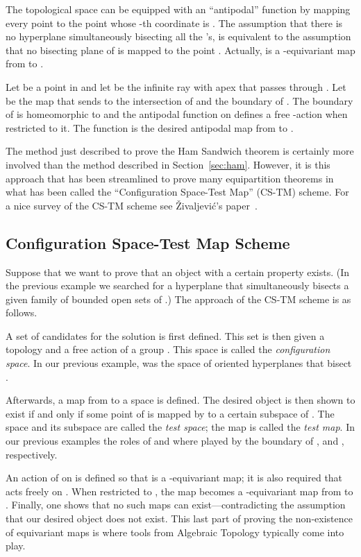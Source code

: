 \documentclass{article}
\begin{document}
The topological space  can be equipped with an ``antipodal''
function by mapping every point  to the point 
whose -th coordinate is . 
The assumption that there is no hyperplane simultaneously
bisecting all the 's, is equivalent to the assumption
that no bisecting plane of  is mapped to the point 
.
Actually,  is a -equivariant map from
 to . 

Let  be a point
in  and let  be the
infinite ray with apex  that passes through . 
Let  be the map that sends  to the intersection of  and
the boundary of . The boundary of  is homeomorphic
to  and the antipodal function on 
defines a free -action when restricted to it.
The function  is the desired 
antipodal map from  to . 

The method just described to prove the Ham Sandwich
theorem is certainly more involved than the method described in 
Section~\ref{sec:ham}. However, it is this approach that has been streamlined
to prove many equipartition theorems in what has been
called the ``Configuration Space-Test Map'' (CS-TM) scheme. 
For a nice survey of the CS-TM scheme 
see {\v{Z}}ivaljevi{\'c}'s paper~\cite{user_guide}.

\subsection{Configuration Space-Test Map Scheme}

Suppose that we want to prove that an object with a certain
 property exists. (In the
previous example we searched for a hyperplane that simultaneously
bisects a given family  of bounded
open sets of .)
The approach of the CS-TM scheme
is as follows.

A set of candidates for the solution is first defined. 
This set is then given a topology and a free action of a group .
This space  is called the \emph{configuration space}. 
In our previous example,  was the space of oriented hyperplanes
that bisect .

Afterwards, a map  from  to a space  is defined.  
The desired object is then shown to exist
if and only if some point of  is mapped by  to a certain
subspace  of . The space  and its subspace
 are called the \emph{test space}; the map  is called
the \emph{test map}. In our previous examples
the roles of  and  where played by the boundary of , 
and , respectively.

An action of  on  is defined
so that  is a -equivariant map; it is also required that
 acts freely on .
When restricted to , the map  becomes a -equivariant map
from  to . Finally, one shows that no such maps can
exist---contradicting the assumption that our desired object does not exist.
This last part of proving the non-existence of equivariant maps
is where tools from Algebraic Topology typically come into play.
\end{document}
